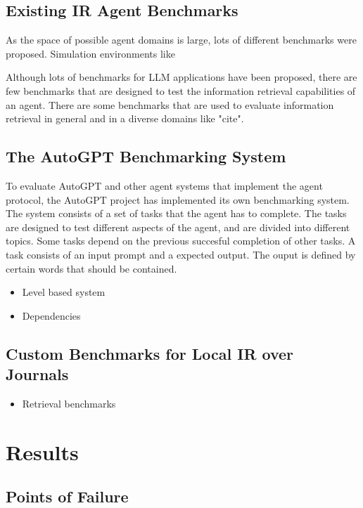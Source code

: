 \documentclass[english, version-2022-01]{uzl-thesis}
\begin{document}
\section{Existing IR Agent Benchmarks}

As the space of possible agent domains is large, lots of different benchmarks were proposed. Simulation environments like

Although lots of benchmarks for LLM applications have been proposed, there are few benchmarks that are designed to test the information retrieval capabilities of an agent. There are some benchmarks that are used to evaluate information retrieval in general and in a diverse domains like "cite".

\section{The AutoGPT Benchmarking System}

To evaluate AutoGPT and other agent systems that implement the agent protocol, the AutoGPT project has implemented its own benchmarking system. The system consists of a set of tasks that the agent has to complete. The tasks are designed to test different aspects of the agent, and are divided into different topics. Some tasks depend on the previous succesful completion of other tasks. A task consists of an input prompt and a expected output. The ouput is defined by certain words that should be contained.

\begin{itemize}
	\item Level based system
	\item Dependencies
\end{itemize}

\section{Custom Benchmarks for Local IR over Journals}

\begin{itemize}
	\item Retrieval benchmarks
\end{itemize}

\chapter{Results}

\section{Points of Failure}
\end{document}
